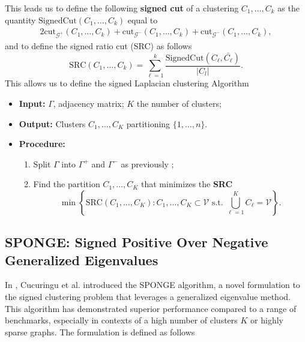 \documentclass[sigconf]{acmart}
\begin{document}
This leads us to define the following \textbf{signed cut} of a clustering $C_1, \ldots, C_k$ as the quantity $\text{SignedCut}(C_1, \ldots, C_k)$ equal to 
\begin{align*}
2 \text{cut}_{\mathcal{G}^+}(C_1, \ldots, C_k) + \text{cut}_{\mathcal{G}^-}(C_1, \ldots, C_k) + \text{cut}_{\mathcal{G}^-}(C_1, \ldots, C_k),
\end{align*}
% 
and to define the signed ratio cut (SRC) as follows
% 
$$ \text{SRC}(C_1, \ldots, C_k) = \sum_{\ell=1}^k \frac{\text{SignedCut}(C_{\ell}, \bar{C_{\ell}})}{|C_l|}. $$
This allows us to define the signed Laplacian clustering Algorithm 

\begin{itemize}
    \item \textbf{Input:} $\Gamma$, adjacency matrix; $K$ the number  of clusters;
    \item \textbf{Output:} Clusters $C_1, \ldots, C_K$ partitioning $\{1, \ldots, n\}$.
    \item \textbf{Procedure: }
    \begin{enumerate}
        \item Split $\Gamma$ into $\Gamma^+$ and $\Gamma^-$ as previously ;
        \item Find the partition $C_1, \ldots, C_K$ that minimizes the \textbf{SRC} 
        \begin{equation}
            \min \left\{ \text{SRC}(C_1, \ldots, C_K) : C_1, \ldots, C_K \subset \mathcal{V} \text{ s.t. } \bigcup_{\ell=1}^K C_{\ell} = \mathcal{V} \right\}.
            \label{signedratiocut-minimization}
        \end{equation}
    \end{enumerate}
\end{itemize}


\subsection{SPONGE: Signed Positive Over Negative Generalized Eigenvalues}
In \cite{cucuringuSPONGE}, Cucuringu et al. introduced the SPONGE algorithm, a novel formulation to the signed clustering problem that leverages a generalized eigenvalue method. This algorithm has demonstrated superior performance compared to a range of benchmarks, especially in contexts of a high number of clusters 
$K$ or highly sparse graphs. The formulation is defined as follows
\end{document}
